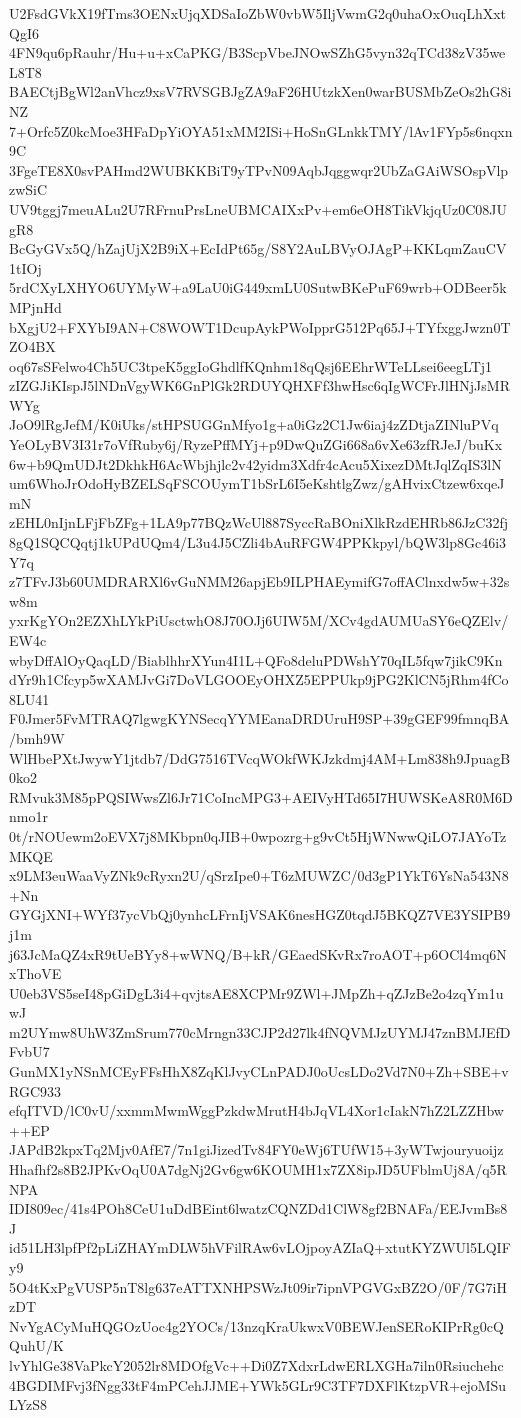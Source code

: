 U2FsdGVkX19fTms3OENxUjqXDSaIoZbW0vbW5IljVwmG2q0uhaOxOuqLhXxtQgI6
4FN9qu6pRauhr/Hu+u+xCaPKG/B3ScpVbeJNOwSZhG5vyn32qTCd38zV35weL8T8
BAECtjBgWl2anVhcz9xsV7RVSGBJgZA9aF26HUtzkXen0warBUSMbZeOs2hG8iNZ
7+Orfc5Z0kcMoe3HFaDpYiOYA51xMM2ISi+HoSnGLnkkTMY/lAv1FYp5s6nqxn9C
3FgeTE8X0svPAHmd2WUBKKBiT9yTPvN09AqbJqggwqr2UbZaGAiWSOspVlpzwSiC
UV9tggj7meuALu2U7RFrnuPrsLneUBMCAIXxPv+em6eOH8TikVkjqUz0C08JUgR8
BcGyGVx5Q/hZajUjX2B9iX+EcIdPt65g/S8Y2AuLBVyOJAgP+KKLqmZauCV1tIOj
5rdCXyLXHYO6UYMyW+a9LaU0iG449xmLU0SutwBKePuF69wrb+ODBeer5kMPjnHd
bXgjU2+FXYbI9AN+C8WOWT1DcupAykPWoIpprG512Pq65J+TYfxggJwzn0TZO4BX
oq67sSFelwo4Ch5UC3tpeK5ggIoGhdlfKQnhm18qQsj6EEhrWTeLLsei6eegLTj1
zIZGJiKIspJ5lNDnVgyWK6GnPlGk2RDUYQHXFf3hwHsc6qIgWCFrJlHNjJsMRWYg
JoO9lRgJefM/K0iUks/stHPSUGGnMfyo1g+a0iGz2C1Jw6iaj4zZDtjaZINluPVq
YeOLyBV3I31r7oVfRuby6j/RyzePffMYj+p9DwQuZGi668a6vXe63zfRJeJ/buKx
6w+b9QmUDJt2DkhkH6AcWbjhjlc2v42yidm3Xdfr4cAcu5XixezDMtJqlZqIS3lN
um6WhoJrOdoHyBZELSqFSCOUymT1bSrL6I5eKshtlgZwz/gAHvixCtzew6xqeJmN
zEHL0nIjnLFjFbZFg+1LA9p77BQzWcUl887SyccRaBOniXlkRzdEHRb86JzC32fj
8gQ1SQCQqtj1kUPdUQm4/L3u4J5CZli4bAuRFGW4PPKkpyl/bQW3lp8Gc46i3Y7q
z7TFvJ3b60UMDRARXl6vGuNMM26apjEb9ILPHAEymifG7offAClnxdw5w+32sw8m
yxrKgYOn2EZXhLYkPiUsctwhO8J70OJj6UIW5M/XCv4gdAUMUaSY6eQZElv/EW4c
wbyDffAlOyQaqLD/BiablhhrXYun4I1L+QFo8deluPDWshY70qIL5fqw7jikC9Kn
dYr9h1Cfcyp5wXAMJvGi7DoVLGOOEyOHXZ5EPPUkp9jPG2KlCN5jRhm4fCo8LU41
F0Jmer5FvMTRAQ7lgwgKYNSecqYYMEanaDRDUruH9SP+39gGEF99fmnqBA/bmh9W
WlHbePXtJwywY1jtdb7/DdG7516TVcqWOkfWKJzkdmj4AM+Lm838h9JpuagB0ko2
RMvuk3M85pPQSIWwsZl6Jr71CoIncMPG3+AEIVyHTd65I7HUWSKeA8R0M6Dnmo1r
0t/rNOUewm2oEVX7j8MKbpn0qJIB+0wpozrg+g9vCt5HjWNwwQiLO7JAYoTzMKQE
x9LM3euWaaVyZNk9cRyxn2U/qSrzIpe0+T6zMUWZC/0d3gP1YkT6YsNa543N8+Nn
GYGjXNI+WYf37ycVbQj0ynhcLFrnIjVSAK6nesHGZ0tqdJ5BKQZ7VE3YSIPB9j1m
j63JcMaQZ4xR9tUeBYy8+wWNQ/B+kR/GEaedSKvRx7roAOT+p6OCl4mq6NxThoVE
U0eb3VS5seI48pGiDgL3i4+qvjtsAE8XCPMr9ZWl+JMpZh+qZJzBe2o4zqYm1uwJ
m2UYmw8UhW3ZmSrum770cMrngn33CJP2d27lk4fNQVMJzUYMJ47znBMJEfDFvbU7
GunMX1yNSnMCEyFFsHhX8ZqKlJvyCLnPADJ0oUcsLDo2Vd7N0+Zh+SBE+vRGC933
efqITVD/lC0vU/xxmmMwmWggPzkdwMrutH4bJqVL4Xor1cIakN7hZ2LZZHbw++EP
JAPdB2kpxTq2Mjv0AfE7/7n1giJizedTv84FY0eWj6TUfW15+3yWTwjouryuoijz
Hhafhf2s8B2JPKvOqU0A7dgNj2Gv6gw6KOUMH1x7ZX8ipJD5UFblmUj8A/q5RNPA
IDI809ec/41s4POh8CeU1uDdBEint6lwatzCQNZDd1ClW8gf2BNAFa/EEJvmBs8J
id51LH3lpfPf2pLiZHAYmDLW5hVFilRAw6vLOjpoyAZIaQ+xtutKYZWUl5LQIFy9
5O4tKxPgVUSP5nT8lg637eATTXNHPSWzJt09ir7ipnVPGVGxBZ2O/0F/7G7iHzDT
NvYgACyMuHQGOzUoc4g2YOCs/13nzqKraUkwxV0BEWJenSERoKIPrRg0cQQuhU/K
lvYhlGe38VaPkcY2052lr8MDOfgVc++Di0Z7XdxrLdwERLXGHa7iln0Rsiuchehc
4BGDIMFvj3fNgg33tF4mPCehJJME+YWk5GLr9C3TF7DXFlKtzpVR+ejoMSuLYzS8
